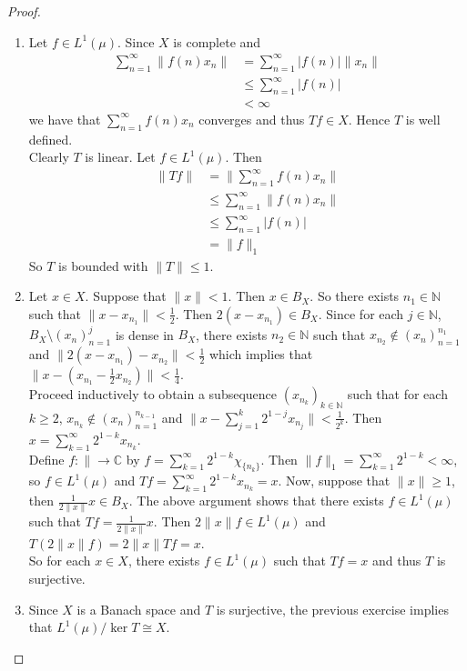 \documentclass[12pt]{amsart}
\newcommand{\C}{\mathbb{C}}
\newcommand{\N}{\mathbb{N}}
\begin{document}
	\begin{proof}
		\begin{enumerate}
			\item Let $f \in L^1(\mu)$. Since $X$ is complete and 
			\begin{align*}
				\sum_{n=1}^{\infty}\|f(n)x_n \|
				& = \sum_{n=1}^{\infty} \vert f(n) \vert \|x_n \|\\
				& \leq \sum_{n=1}^{\infty} \vert f(n) \vert \\
				&< \infty 
			\end{align*}
			we have that $\sum_{n=1}^{\infty} f(n)x_n $ converges and thus $Tf \in X$. Hence $T$ is well defined. \vspace{.5cm}\\
			Clearly $T$ is linear. Let $f \in L^1(\mu)$. Then
			\begin{align*}
				\|Tf \|
				&= \| \sum_{n=1}^{\infty} f(n)x_n \|\\
				& \leq \sum_{n=1}^{\infty} \|f(n)x_n \|\\
				& \leq \sum_{n=1}^{\infty} \vert f(n) \vert \\
				&= \|f \|_1
			\end{align*}
			So $T$ is bounded with $\|T \|\leq 1$.\vspace{.5cm}\\
			\item Let $x \in X$. Suppose that $\|x \|< 1$. Then $x \in B_X$. So there exists $n_1 \in \N$ such that $\|x - x_{n_1} \|< \frac{1}{2}$. Then $2(x-x_{n_1}) \in B_X$. Since for each $j \in \N$, $B_X\setminus (x_n)_{n=1}^j$ is dense in $B_X$, there exists $n_2 \in \N$ such that $x_{n_2} \not \in (x_n)_{n=1}^{n_1}$ and $\|2(x- x_{n_1}) - x_{n_2} \|< \frac{1}{2}$ which implies that $\|x- (x_{n_1} - \frac{1}{2}x_{n_2}) \|< \frac{1}{4}$. \vspace{.5cm}\\ 
			Proceed inductively to obtain a subsequence $(x_{n_k})_{k \in \N}$ such that for each $k \geq 2$, $x_{n_k} \not \in (x_n)_{n=1}^{n_{k-1}}$ and $\|x - \sum_{j=1}^k 2^{1-j}x_{n_j} \|< \frac{1}{2^k}$. Then $x = \sum_{k=1}^{\infty}2^{1-k}x_{n_k}$. \vspace{.5cm} \\ 
			Define $f:\|\rightarrow \C$ by $f = \sum_{k=1}^{\infty}2^{1-k}\chi_{\{n_k\}}$. Then $\|f \|_1 = \sum_{k=1}^{\infty}2^{1-k}< \infty$, so $f \in L^1(\mu)$ and $Tf = \sum_{k=1}^{\infty}2^{1-k}x_{n_k} = x$. Now, suppose that $\|x \|\geq 1$, then $\frac{1}{2\|x \|}x \in B_X$. The above argument shows that there exists $f \in L^1(\mu)$ such that $Tf = \frac{1}{2\|x \|}x$. Then $2 \|x \|f \in L^1(\mu)$ and $T(2 \|x \|f) = 2 \|x \|Tf =x$. \\
			So for each $x \in X$, there exists $f \in L^1(\mu)$ such that $Tf = x$ and thus $T$ is surjective. 
			\item Since $X$ is a Banach space and $T$ is surjective, the previous exercise implies that $L^1(\mu)/\ker T \cong X$. 
		\end{enumerate}
	\end{proof}
	
\end{document}
